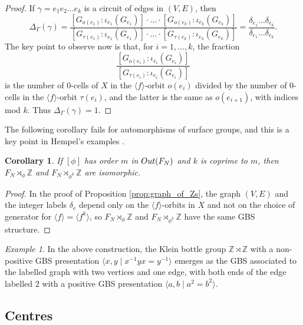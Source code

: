 \documentclass[11pt, a4 paper]{amsart}
\numberwithin{equation}{section}
\newtheorem{corollary}[theorem]{Corollary}
\theoremstyle{remark}
\newtheorem{example}[theorem]{Example}
\theoremstyle{definition}
\def\Z{\mathbb Z}
\def\-{\overline}
\def\outN{{\rm{Out}}(F_N)}
\def\d{\delta}
\def\-{\overline}
\def\<{\langle}
\def\>{\rangle}
\begin{document}
\begin{proof}
	If $\gamma= e_1e_2\ldots e_k$ is a circuit of edges in $(V,E)$, 
	then 
	\begin{equation} 
		\Delta_\Gamma(\gamma)=
		\frac{
			[G_{o(e_1)}: \iota_{\-{e}_1}(G_{e_1})] 
			\cdot\ldots\cdot [G_{o(e_k)}: \iota_{\-{e}_k}(G_{e_k})]
		}{
			[G_{\tau(e_1)}: \iota_{e_1} (G_{e_1})] 
			\cdot\ldots\cdot [G_{\tau(e_k)}: \iota_{e_k}(G_{e_k})]
		}
		= \frac{
			\d_{\-e_1}\dots \d_{\-e_k}
		}{
			\d_{e_1}\dots \d_{e_k}
		}.
	\end{equation} 
	The key point to observe now is that, for $i=1,\dots,k$, the fraction
	\begin{equation*}
		\frac{
			[G_{o(e_i)}: \iota_{\-{e}_i}(G_{e_i})]
		}{
			[G_{\tau(e_i)}: \iota_{e_i}(G_{e_i})]
		}
	\end{equation*} 
	is the number of $0$-cells of $X$ in the $\<f\>$-orbit $o(e_i)$ 
	divided by the number of 0-cells in the $\<f\>$-orbit $\tau(e_i)$, 
	and the latter is the same as $o(e_{i+1})$, with indices mod $k$. 
	Thus $\Delta_\Gamma(\gamma)=1$.
\end{proof}

The following corollary fails for automorphisms of surface groups, 
and this is a key point in Hempel's examples \cite{hempel2014some}. 

\begin{corollary}
\label{c:coprime-iso}
	If $[\phi]$ has order $m$ in $\outN$ and $k$ is coprime to $m$, 
	then $F_N\rtimes_\phi\Z$ and $F_N\rtimes_{\phi^k}\Z$
	are isomorphic.
\end{corollary}

\begin{proof} 
	In the proof of Proposition \ref{prop:graph_of_Zs},
	the graph $(V,E)$ and the integer labels $\delta_e$ depend only on the $\<f\>$-orbits in $X$ and not on the choice
	of generator for $\<f\>= \<f^k\>$, so $F_N\rtimes_\phi\Z$ and $F_N\rtimes_{\phi^k}\Z$ have the same GBS structure.
\end{proof}

\begin{example}
\label{e:klein}
	In the above construction, the Klein bottle group $\Z\rtimes\Z$ 
	with a non-positive GBS presentation 
	$\< x, y \mid x^{-1}yx = y^{-1} \>$ 
	emerges as the GBS associated to the labelled graph with
	two vertices and one edge, 
	with both ends of the edge labelled $2$ 
	with a positive GBS presentation $\< a, b \mid a^2 = b^2 \>$.
\end{example}


\subsection{Centres}
\end{document}

